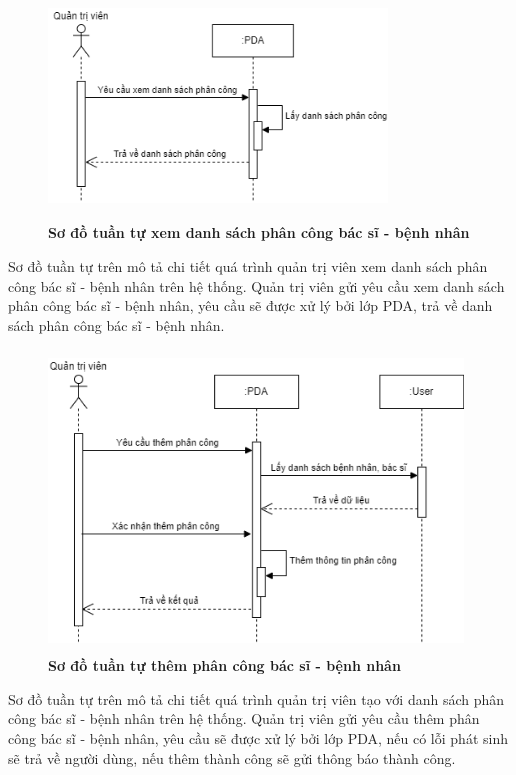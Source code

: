 \begin{figure}[H]
  \centering
  \includegraphics[width=9cm,height=6cm]{Images/sequence/sequence_manage_pda.png}
  \caption[Sơ đồ tuần tự xem danh sách phân công bác sĩ - bệnh nhân]{\bfseries \fontsize{12pt}{0pt}
  \selectfont Sơ đồ tuần tự xem danh sách phân công bác sĩ - bệnh nhân}
  \label{sequence_manage_pda} %
\end{figure}
Sơ đồ tuần tự trên mô tả chi tiết quá trình quản trị viên xem danh sách phân công bác sĩ - bệnh nhân trên hệ thống. Quản trị viên gửi yêu cầu
xem danh sách phân công bác sĩ - bệnh nhân, yêu cầu sẽ được xử lý bởi lớp PDA, trả về danh sách phân công bác sĩ - bệnh nhân. 

\begin{figure}[H]
  \centering
  \includegraphics[width=11cm,height=8cm]{Images/sequence/sequence_manage_add_pda.png}
  \caption[Sơ đồ tuần tự thêm phân công bác sĩ - bệnh nhân]{\bfseries \fontsize{12pt}{0pt}
  \selectfont Sơ đồ tuần tự thêm phân công bác sĩ - bệnh nhân}
  \label{sequence_manage_add_pda} %
\end{figure}
Sơ đồ tuần tự trên mô tả chi tiết quá trình quản trị viên tạo với danh sách phân công bác sĩ - bệnh nhân trên hệ thống. Quản trị viên gửi yêu cầu
thêm phân công bác sĩ - bệnh nhân, yêu cầu sẽ được xử lý bởi lớp PDA, nếu có lỗi phát sinh sẽ trả về người dùng, nếu thêm thành công sẽ gửi thông báo thành công.

